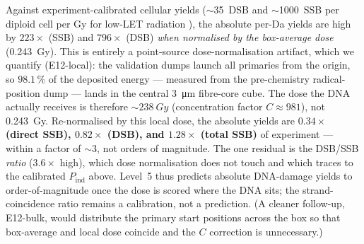 \documentclass[11pt]{article}
\begin{document}
Against experiment-calibrated cellular yields (\(\sim\)35~DSB and
\(\sim\)1000~SSB per diploid cell per Gy for low-LET radiation
\cite{ward1988}), the absolute per-Da yields are high by $223\times$ (SSB) and
$796\times$ (DSB) \emph{when normalised by the box-average dose}
(\SI{0.243}{Gy}). This is entirely a point-source dose-normalisation artifact,
which we quantify (E12-local): the validation dumps launch all primaries from
the origin, so $98.1\,\%$ of the deposited energy --- measured from the
pre-chemistry radical-position dump --- lands in the central \SI{3}{\micro m}
fibre-core cube. The dose the DNA actually receives is therefore
${\sim}\SI{238}{Gy}$ (concentration factor $C\approx981$), not
\SI{0.243}{Gy}. Re-normalised by this local dose, the absolute yields are
\textbf{$0.34\times$ (direct SSB), $0.82\times$ (DSB), and $1.28\times$ (total
SSB)} of experiment --- within a factor of ${\sim}3$, not orders of magnitude.
The one residual is the DSB/SSB \emph{ratio} ($3.6\times$ high), which dose
normalisation does not touch and which traces to the calibrated
$P_{\mathrm{ind}}$ above. Level~5 thus predicts absolute DNA-damage yields to
order-of-magnitude once the dose is scored where the DNA sits; the
strand-coincidence ratio remains a calibration, not a prediction. (A cleaner
follow-up, E12-bulk, would distribute the primary start positions across the
box so that box-average and local dose coincide and the $C$ correction is
unnecessary.)
\end{document}
